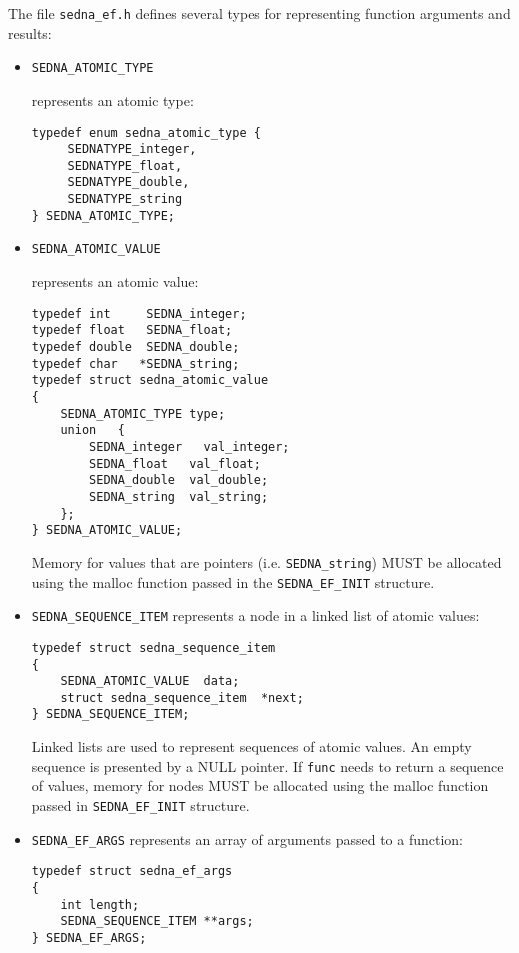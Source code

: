 \documentclass[a4paper,12pt]{article}
\begin{document}
The file \verb!sedna_ef.h! defines several types for representing
function arguments and results:
\begin{itemize}
	\item \verb!SEDNA_ATOMIC_TYPE!

		represents an atomic type:
		\begin{verbatim}
typedef enum sedna_atomic_type {
     SEDNATYPE_integer,
     SEDNATYPE_float,
     SEDNATYPE_double,
     SEDNATYPE_string
} SEDNA_ATOMIC_TYPE;
		\end{verbatim}

	\item \verb!SEDNA_ATOMIC_VALUE!

		represents an atomic value:
\begin{verbatim}
typedef int     SEDNA_integer;
typedef float   SEDNA_float;
typedef double  SEDNA_double;
typedef char   *SEDNA_string;
typedef struct sedna_atomic_value
{
    SEDNA_ATOMIC_TYPE type;
    union	{
        SEDNA_integer	val_integer;
        SEDNA_float	  val_float;
        SEDNA_double  val_double;
        SEDNA_string  val_string;
    };
} SEDNA_ATOMIC_VALUE;
\end{verbatim}

		Memory for values that are pointers (i.e. \verb!SEDNA_string!) MUST be
		allocated using the malloc function passed in the \verb!SEDNA_EF_INIT! structure.


	\item \verb!SEDNA_SEQUENCE_ITEM!
	  represents a node in a linked list of atomic values:

	  \begin{verbatim}
typedef struct sedna_sequence_item
{
    SEDNA_ATOMIC_VALUE	data;
    struct sedna_sequence_item	*next;
} SEDNA_SEQUENCE_ITEM;
		\end{verbatim}

		Linked lists are used to represent sequences of atomic values.
		An empty sequence is presented by a NULL pointer.
		If \verb!func! needs to return a sequence of values, memory for nodes
		MUST be allocated using the malloc function passed in \verb!SEDNA_EF_INIT!
		structure.

	\item \verb!SEDNA_EF_ARGS!
	  represents an array of arguments passed to a function:
	  \begin{verbatim}
typedef struct sedna_ef_args
{
    int length;
    SEDNA_SEQUENCE_ITEM **args;
} SEDNA_EF_ARGS;
\end{verbatim}
\end{itemize}
\end{document}
